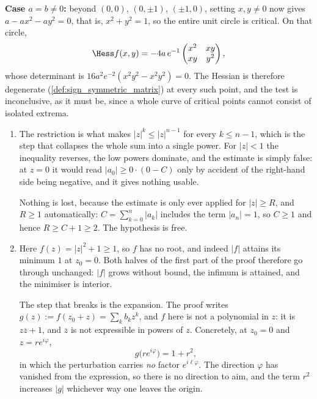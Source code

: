 \begin{exercisesolution}
\textbf{Case $a=b\neq0$:} beyond $(0,0)$, $(0,\pm1)$, $(\pm1,0)$, setting $x,y\neq0$ now gives
$a-ax^2-ay^2=0$, that is, $x^2+y^2=1$, so the entire unit circle is critical. On that circle,
\[\Hess f(x,y) = -4a\,e^{-1}\begin{pmatrix} x^2 & xy \\ xy & y^2 \end{pmatrix},\]
whose determinant is $16a^2e^{-2}(x^2y^2 - x^2y^2) = 0$. The Hessian is therefore degenerate
(\cref{def:sign_symmetric_matrix}) at every such point, and the test is inconclusive, as it must
be, since a whole curve of critical points cannot consist of isolated extrema.
\end{exercisesolution}

\begin{exercisesolution}
\label{sol:ai_fta_hypotheses}
\begin{enumerate}[label=\textbf{(\alph*)}]
  \item The restriction is what makes $\lvert z\rvert^k \leq \lvert z\rvert^{n-1}$ for every
    $k \leq n-1$, which is the step that collapses the whole sum into a single power. For
    $\lvert z\rvert < 1$ the inequality reverses, the low powers dominate, and the estimate is
    simply false: at $z = 0$ it would read $\lvert a_0\rvert \geq 0 \cdot (0 - C)$ only by
    accident of the right-hand side being negative, and it gives nothing usable.

    Nothing is lost, because the estimate is only ever applied for $\lvert z\rvert \geq R$, and
    $R \geq 1$ automatically: $C = \sum_{k=0}^n\lvert a_k\rvert$ includes the term
    $\lvert a_n\rvert = 1$, so $C \geq 1$ and hence $R \geq C+1 \geq 2$. The hypothesis is free.
  \item Here $f(z) = \lvert z\rvert^2+1 \geq 1$, so $f$ has no root, and indeed
    $\lvert f\rvert$ attains its minimum $1$ at $z_0 = 0$. Both halves of the first part of the
    proof therefore go through unchanged: $\lvert f\rvert$ grows without bound, the infimum is
    attained, and the minimiser is interior.

    The step that breaks is the expansion. The proof writes $g(z) := f(z_0+z) = \sum_k b_kz^k$,
    and $f$ here is not a polynomial in $z$: it is $z\overline z + 1$, and $\overline z$ is not
    expressible in powers of $z$. Concretely, at $z_0 = 0$ and $z = re^{i\varphi}$,
    \[g\big(re^{i\varphi}\big) = 1 + r^2,\]
    in which the perturbation carries \emph{no} factor $e^{i\ell\varphi}$. The direction
    $\varphi$ has vanished from the expression, so there is no direction to aim, and the term
    $r^2$ increases $\lvert g\rvert$ whichever way one leaves the origin.


\end{enumerate}
\end{exercisesolution}
